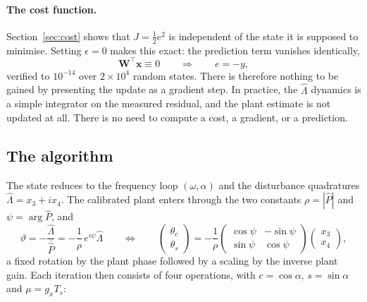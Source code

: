 \documentclass[11pt]{article}
\newcommand{\vx}{\mathbf{x}}
\newcommand{\vW}{\mathbf{W}}
\begin{document}
\paragraph{The cost function.}
Section~\ref{sec:cost} shows that $J=\tfrac12 e^2$ is independent of the state it is supposed to minimise.
%
Setting $\epsilon=0$ makes this exact: the prediction term vanishes identically,
%
\begin{equation}
  \vW^\top\vx\equiv0
  \qquad\Longrightarrow\qquad
  e=-y ,
  \label{eq:eisy}
\end{equation}
%
verified to $10^{-14}$ over $2\times10^{4}$ random states.
%
There is therefore nothing to be gained by presenting the update as a gradient step.
%
In practice, the $\hat\Lambda$ dynamics is a simple integrator on the measured residual, and the plant estimate is not updated at all. There is no need to compute a cost, a gradient, or a prediction.

\subsection{The algorithm}

The state reduces to the frequency loop $(\omega,\alpha)$ and the disturbance quadratures $\hat\Lambda=x_3+ix_4$.
%
The calibrated plant enters through the two constants $\rho=|\hat P|$ and $\psi=\arg\hat P$, and
%
\begin{equation}
  \vartheta=-\frac{\hat\Lambda}{\overline{\hat P}}=-\frac{1}{\rho}\,e^{i\psi}\hat\Lambda
  \qquad\Longleftrightarrow\qquad
  \begin{pmatrix}\theta_c\\\theta_s\end{pmatrix}
  =-\frac{1}{\rho}
   \begin{pmatrix}\cos\psi & -\sin\psi\\ \sin\psi & \cos\psi\end{pmatrix}
   \begin{pmatrix}x_3\\x_4\end{pmatrix} ,
  \label{eq:fixedmap}
\end{equation}
%
a fixed rotation by the plant phase followed by a scaling by the inverse plant gain.
%
Each iteration then consists of four operations, with $c=\cos\alpha$, $s=\sin\alpha$ and $\mu=g_xT_s$:
\end{document}
